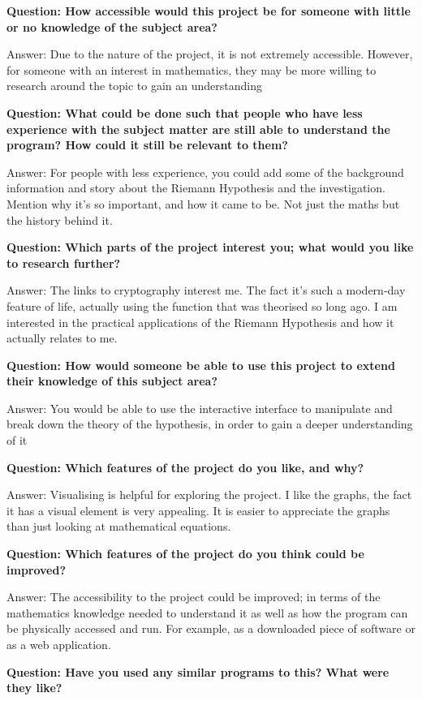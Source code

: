 \documentclass{article}
\begin{document}
\textbf{Question: How accessible would this project be for someone with little or no knowledge of the subject area?}

Answer: Due to the nature of the project, it is not extremely accessible. However, for someone with an interest in mathematics, they may be more willing to research around the topic to gain an understanding

\textbf{Question: What could be done such that people who have less experience with the subject matter are still able to understand the program? How could it still be relevant to them?}

Answer: For people with less experience, you could add some of the background information and story about the Riemann Hypothesis and the investigation. Mention why it's so important, and how it came to be. Not just the maths but the history behind it.

\textbf{Question: Which parts of the project interest you; what would you like to research further?}

Answer: The links to cryptography interest me. The fact it’s such a modern-day feature of life, actually using the function that was theorised so long ago. I am interested in the practical applications of the Riemann Hypothesis and how it actually relates to me.

\textbf{Question: How would someone be able to use this project to extend their knowledge of this subject area?}

Answer: You would be able to use the interactive interface to manipulate and break down the theory of the hypothesis, in order to gain a deeper understanding of it

\textbf{Question: Which features of the project do you like, and why?}

Answer: Visualising is helpful for exploring the project. I like the graphs, the fact it has a visual element is very appealing. It is easier to appreciate the graphs than just looking at mathematical equations.

\textbf{Question: Which features of the project do you think could be improved?}

Answer: The accessibility to the project could be improved; in terms of the mathematics knowledge needed to understand it as well as how the program can be physically accessed and run. For example, as a downloaded piece of software or as a web application.

\textbf{Question: Have you used any similar programs to this? What were they like?}
\end{document}
